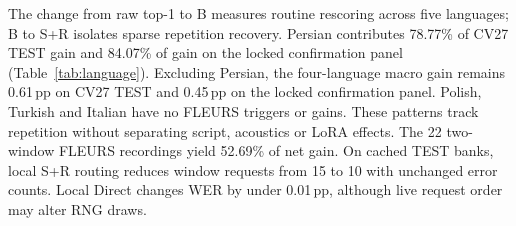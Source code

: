 The change from raw top-1 to B measures routine rescoring across five languages; B to S+R isolates sparse repetition recovery. Persian contributes 78.77\% of CV27 TEST gain and 84.07\% of gain on the locked confirmation panel (Table~\ref{tab:language}). Excluding Persian, the four-language macro gain remains 0.61\,pp on CV27 TEST and 0.45\,pp on the locked confirmation panel. Polish, Turkish and Italian have no FLEURS triggers or gains. These patterns track repetition without separating script, acoustics or LoRA effects. The 22 two-window FLEURS recordings yield 52.69\% of net gain. On cached TEST banks, local S+R routing reduces window requests from 15 to 10 with unchanged error counts. Local Direct changes WER by under 0.01\,pp, although live request order may alter RNG draws.
